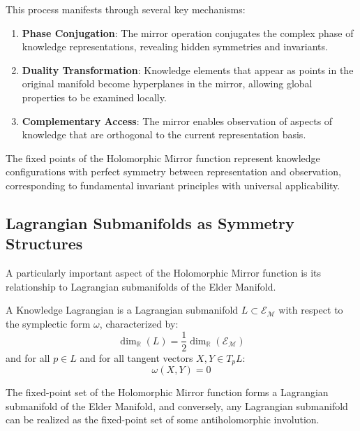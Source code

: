 This process manifests through several key mechanisms:

\begin{enumerate}
\item \textbf{Phase Conjugation}: The mirror operation conjugates the complex phase of knowledge representations, revealing hidden symmetries and invariants.
\item \textbf{Duality Transformation}: Knowledge elements that appear as points in the original manifold become hyperplanes in the mirror, allowing global properties to be examined locally.
\item \textbf{Complementary Access}: The mirror enables observation of aspects of knowledge that are orthogonal to the current representation basis.
\end{enumerate}

\begin{proposition}
The fixed points of the Holomorphic Mirror function represent knowledge configurations with perfect symmetry between representation and observation, corresponding to fundamental invariant principles with universal applicability.
\end{proposition}

\subsection{Lagrangian Submanifolds as Symmetry Structures}

A particularly important aspect of the Holomorphic Mirror function is its relationship to Lagrangian submanifolds of the Elder Manifold.

\begin{definition}
A Knowledge Lagrangian is a Lagrangian submanifold $L \subset \mathcal{E}_{\mathcal{M}}$ with respect to the symplectic form $\omega$, characterized by:
\begin{equation}
\dim_{\mathbb{R}}(L) = \frac{1}{2}\dim_{\mathbb{R}}(\mathcal{E}_{\mathcal{M}})
\end{equation}
and for all $p \in L$ and for all tangent vectors $X, Y \in T_pL$:
\begin{equation}
\omega(X, Y) = 0
\end{equation}
\end{definition}

\begin{theorem}
The fixed-point set of the Holomorphic Mirror function forms a Lagrangian submanifold of the Elder Manifold, and conversely, any Lagrangian submanifold can be realized as the fixed-point set of some antiholomorphic involution.
\end{theorem}

